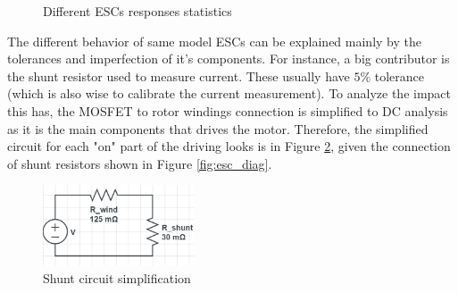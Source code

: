 \begin{figure}[!tbp]
  \centering
  \caption{Different ESCs responses statistics}
  \label{fig:esc_esc_stats}
\end{figure}

The different behavior of same model ESCs can be explained mainly by the tolerances and imperfection of it's components. For instance, a big contributor is the shunt resistor used to measure current. These usually have $5\%$ tolerance (which is also wise to calibrate the current measurement). To analyze the impact this has, the MOSFET to rotor windings connection is simplified to DC analysis as it is the main components that drives the motor. Therefore, the simplified circuit for each "on" part of the driving looks is in Figure \ref{fig:shunt_circuit}, given the connection of shunt resistors shown in Figure \ref{fig:esc_diag}.

\begin{figure}
  \centering
  \includegraphics[width=0.4\textwidth]{images/shunt_circuit.png}
  \caption{Shunt circuit simplification}
  \label{fig:shunt_circuit}
\end{figure}

